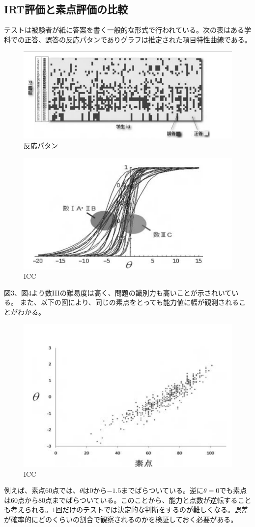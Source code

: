 \documentclass[12pt]{jarticle}
\begin{document}
\subsection{IRT評価と素点評価の比較}
テストは被験者が紙に答案を書く一般的な形式で行われている。次の表はある学科での正答、誤答の反応パタンでありグラフは推定された項目特性曲線である。
\begin{figure}[H]
  \includegraphics[bb = -230 300 1 1,scale = 0.5]{02.png}
  \vspace{4.5cm}
  \caption{反応パタン}
\end{figure}
\begin{figure}[H]
  \includegraphics[bb = -230 300 1 1,scale = 0.5]{03.png}
  \vspace{4.8cm}
  \caption{ICC}
\end{figure}
図$3$、図$4$より数IIIの難易度は高く、問題の識別力も高いことが示されいている。
また、以下の図により、同じの素点をとっても能力値に幅が観測されることがわかる。
\begin{figure}[H]
  \includegraphics[bb = -200 300 1 1,scale = 0.5]{04.png}
  \vspace{4.8cm}
  \caption{ICC}
\end{figure}
例えば、素点$60$点では、$\theta$は$0$から$-1.5$までばらついている。逆に$\theta = 0$でも素点は$60$点から$80$点までばらついている。このことから、能力と点数が逆転することも考えられる。$1$回だけのテストでは決定的な判断をするのが難しくなる。誤差が確率的にどのくらいの割合で観察されるのかを検証しておく必要がある。
\end{document}
